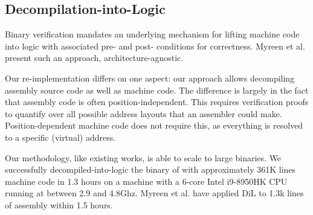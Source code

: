 \subsection{Decompilation-into-Logic}\label{sec:machine_model_overview}

Binary verification mandates an underlying mechanism for lifting machine code into logic with associated pre- and post- conditions for correctness. Myreen et al. \cite{4689183,myreen2012decompilation} present such an approach, architecture-agnostic. 

Our re-implementation differs on one aspect: our approach allows decompiling assembly source code as well as machine code.
The difference is largely in the fact that assembly code is often position-independent.
This requires verification proofs to quantify over all possible address layouts that an assembler could make. Position-dependent machine code does not require this, as everything is resolved to a specific (virtual) address. 

Our methodology, like existing works, is able to scale to large binaries.
We successfully decompiled-into-logic the binary of  with approximately 361K lines machine code in 1.3 hours on a machine with a 6-core Intel i9-8950HK CPU running at between 2.9 and 4.8Ghz.
Myreen et al. have applied DiL to 1.3k lines of assembly within 1.5 hours.

